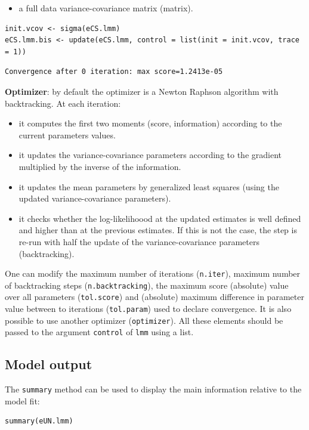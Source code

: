 \documentclass[12pt]{article}
\begin{document}
\begin{itemize}
\item a full data variance-covariance matrix (matrix).
\end{itemize}
\lstset{language=r,label= ,caption= ,captionpos=b,numbers=none}
\begin{lstlisting}
init.vcov <- sigma(eCS.lmm)
eCS.lmm.bis <- update(eCS.lmm, control = list(init = init.vcov, trace = 1))
\end{lstlisting}

\begin{verbatim}
Convergence after 0 iteration: max score=1.2413e-05
\end{verbatim}


\textbf{Optimizer}: by default the optimizer is a Newton Raphson algorithm
with backtracking. At each iteration:
\begin{itemize}
\item it computes the first two moments (score, information) according to
the current parameters values.
\item it updates the variance-covariance parameters according to the
gradient multiplied by the inverse of the information.
\item it updates the mean parameters by generalized least squares (using
the updated variance-covariance parameters).
\item it checks whether the log-likelihoood at the updated estimates is
well defined and higher than at the previous estimates. If this is
not the case, the step is re-run with half the update of the
variance-covariance parameters (backtracking).
\end{itemize}

One can modify the maximum number of iterations (\texttt{n.iter}), maximum
number of backtracking steps (\texttt{n.backtracking}), the maximum score
(absolute) value over all parameters (\texttt{tol.score}) and (absolute)
maximum difference in parameter value between to iterations
(\texttt{tol.param}) used to declare convergence. It is also possible to use
another optimizer (\texttt{optimizer}). All these elements should be passed
to the argument \texttt{control} of \texttt{lmm} using a list.

\clearpage

\subsection{Model output}
\label{sec:org6316e64}

The \texttt{summary} method can be used to display the main information
relative to the model fit:
\lstset{language=r,label= ,caption= ,captionpos=b,numbers=none}
\begin{lstlisting}
summary(eUN.lmm)
\end{lstlisting}
\end{document}
